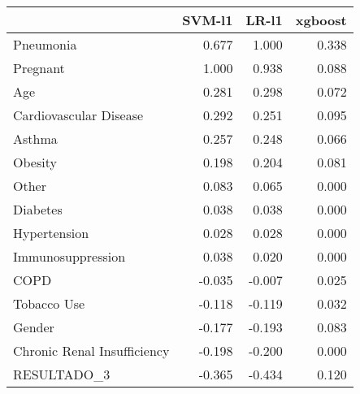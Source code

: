 \begin{tabular}{lrrr}
\toprule
{} &  SVM-l1 &  LR-l1 &  xgboost \\
\midrule
Pneumonia                   &   0.677 &  1.000 &    0.338 \\
Pregnant                    &   1.000 &  0.938 &    0.088 \\
Age                         &   0.281 &  0.298 &    0.072 \\
Cardiovascular Disease      &   0.292 &  0.251 &    0.095 \\
Asthma                      &   0.257 &  0.248 &    0.066 \\
Obesity                     &   0.198 &  0.204 &    0.081 \\
Other                       &   0.083 &  0.065 &    0.000 \\
Diabetes                    &   0.038 &  0.038 &    0.000 \\
Hypertension                &   0.028 &  0.028 &    0.000 \\
Immunosuppression           &   0.038 &  0.020 &    0.000 \\
COPD                        &  -0.035 & -0.007 &    0.025 \\
Tobacco Use                 &  -0.118 & -0.119 &    0.032 \\
Gender                      &  -0.177 & -0.193 &    0.083 \\
Chronic Renal Insufficiency &  -0.198 & -0.200 &    0.000 \\
RESULTADO\_3                 &  -0.365 & -0.434 &    0.120 \\
\bottomrule
\end{tabular}
